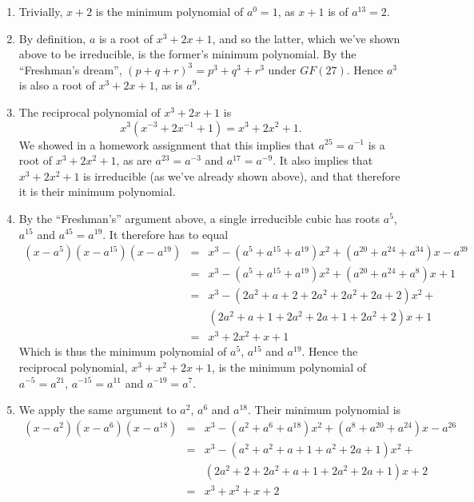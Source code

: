 \documentclass[11pt]{article} \usepackage{amssymb}
\begin{document}
\begin{enumerate}
\begin{enumerate}
    \begin{enumerate}
    \item 
      Trivially, $x+2$ is the minimum polynomial of $a^0=1$, as
      $x+1$ is of $a^{13}=2$.
    \item
      By definition, $a$ is a root of $x^3+2x+1$, and so the latter, which we've
      shown above to be irreducible, is the former's minimum 
      polynomial. By the ``Freshman's dream'', $(p+q+r)^3=p^3+q^3+r^3$ under
      $GF(27)$. Hence $a^3$ is also  a root of $x^3+2x+1$, as is $a^9$.
    \item
      The reciprocal polynomial of $x^3+2x+1$ is 
      $$x^3(x^{-3}+2x^{-1}+1)=x^3+2x^2+1.$$
      We showed in a homework assignment that this implies that
      $a^{25}=a^{-1}$ is a root
      of $x^3+2x^2+1$, as are $a^{23}=a^{-3}$ and $a^{17}=a^{-9}$. It also implies that 
      $x^3+2x^2+1$ is irreducible (as we've already shown above), and that
      therefore it is their minimum polynomial.
    \item
      By the ``Freshman's'' argument above, a single irreducible cubic has 
      roots $a^5$, $a^{15}$ and $a^{45}=a^{19}$. It therefore has to equal 
      \begin{eqnarray*}
        (x-a^{5})(x-a^{15})(x-a^{19})
            &=& x^3-(a^{5}+a^{15}+a^{19})x^2+(a^{20}+a^{24}+a^{34})x-a^{39}
        \\  &=& x^3-(a^{5}+a^{15}+a^{19})x^2+(a^{20}+a^{24}+a^{8})x+1
        \\  &=& x^3-(2a^2+a+2+2a^2+2a^2+2a+2)x^2+
        \\   &&(2a^2+a+1+2a^2+2a+1+2a^2+2)x+1
        \\  &=& x^3+2x^2+x+1 
      \end{eqnarray*}
      Which is thus the minimum polynomial of $a^{5}$, $a^{15}$ and $a^{19}$. 
      Hence the reciprocal polynomial, $x^3+x^2+2x+1$,
      is the minimum polynomial of $a^{-5}=a^{21}$, $a^{-15}=a^{11}$ and
      $a^{-19}=a^{7}$.
    \item
      We apply the same argument to $a^2$, $a^6$ and $a^{18}$. Their minimum
      polynomial is
      \begin{eqnarray*}
        (x-a^{2})(x-a^{6})(x-a^{18})
            &=& x^3-(a^{2}+a^{6}+a^{18})x^2+(a^{8}+a^{20}+a^{24})x-a^{26}
        \\  &=& x^3-(a^2+a^2+a+1+a^2+2a+1)x^2+
        \\   && (2a^2+2+2a^2+a+1+2a^2+2a+1)x+2
        \\  &=& x^3+x^2+x+2 
      \end{eqnarray*}

\end{enumerate}
\end{enumerate}
\end{enumerate}
\end{document}
